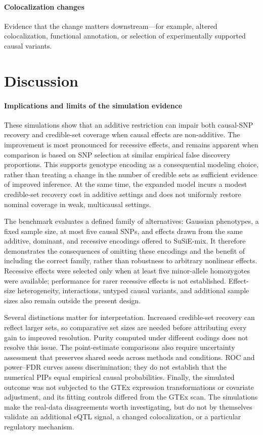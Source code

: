\documentclass[12pt]{article}
\begin{document}
\paragraph{Colocalization changes}
Evidence that the change matters downstream—for example, altered colocalization, functional annotation, or selection of experimentally supported causal variants.

\section{Discussion}

\paragraph{Implications and limits of the simulation evidence}

These simulations show that an additive restriction can impair both
causal-SNP recovery and credible-set coverage when causal effects are
non-additive. The improvement is most pronounced for recessive effects,
and remains apparent when comparison is based on SNP selection at
similar empirical false discovery proportions. This supports genotype
encoding as a consequential modeling choice, rather than treating a
change in the number of credible sets as sufficient evidence of improved
inference. At the same time, the expanded model incurs a modest
credible-set recovery cost in additive settings and does not uniformly
restore nominal coverage in weak, multicausal settings.

The benchmark evaluates a defined family of alternatives: Gaussian
phenotypes, a fixed sample size, at most five causal SNPs, and effects
drawn from the same additive, dominant, and recessive encodings offered
to SuSiE-mix. It therefore demonstrates the consequences of omitting
these encodings and the benefit of including the correct family, rather
than robustness to arbitrary nonlinear effects. Recessive effects were
selected only when at least five minor-allele homozygotes were available;
performance for rarer recessive effects is not established. Effect-size
heterogeneity, interactions, untyped causal variants, and additional
sample sizes also remain outside the present design.

Several distinctions matter for interpretation. Increased credible-set
recovery can reflect larger sets, so comparative set sizes are needed
before attributing every gain to improved resolution. Purity computed
under different codings does not resolve this issue. The point-estimate
comparisons also require uncertainty assessment that preserves shared
seeds across methods and conditions. ROC and power--FDR curves assess
discrimination; they do not establish that the numerical PIPs equal
empirical causal probabilities. Finally, the simulated outcome was not
subjected to the GTEx expression transformations or covariate adjustment,
and its fitting controls differed from the GTEx scan. The simulations
make the real-data disagreements worth investigating, but do not by
themselves validate an additional eQTL signal, a changed colocalization,
or a particular regulatory mechanism.
\end{document}
